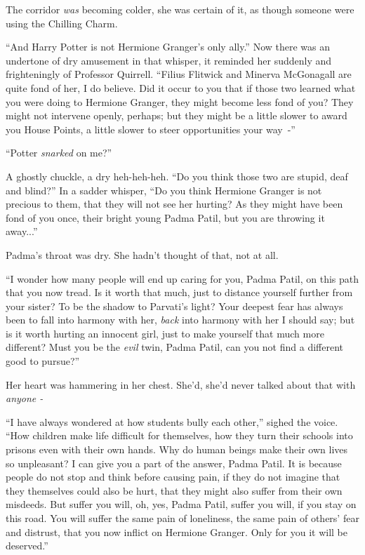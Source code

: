 The corridor \emph{was} becoming colder, she was certain of it, as though someone were using the Chilling Charm.

``And Harry Potter is not Hermione Granger's only ally.'' Now there was an undertone of dry amusement in that whisper, it reminded her suddenly and frighteningly of Professor Quirrell. ``Filius Flitwick and Minerva McGonagall are quite fond of her, I do believe. Did it occur to you that if those two learned what you were doing to Hermione Granger, they might become less fond of you? They might not intervene openly, perhaps; but they might be a little slower to award you House Points, a little slower to steer opportunities your way~-''

``Potter \emph{snarked} on me?''

A ghostly chuckle, a dry heh-heh-heh. ``Do you think those two are stupid, deaf and blind?'' In a sadder whisper, ``Do you think Hermione Granger is not precious to them, that they will not see her hurting? As they might have been fond of you once, their bright young Padma Patil, but you are throwing it away...''

Padma's throat was dry. She hadn't thought of that, not at all.

``I wonder how many people will end up caring for you, Padma Patil, on this path that you now tread. Is it worth that much, just to distance yourself further from your sister? To be the shadow to Parvati's light? Your deepest fear has always been to fall into harmony with her, \emph{back} into harmony with her I should say; but is it worth hurting an innocent girl, just to make yourself that much more different? Must you be the \emph{evil} twin, Padma Patil, can you not find a different good to pursue?''

Her heart was hammering in her chest. She'd, she'd never talked about that with \emph{anyone -}

``I have always wondered at how students bully each other,'' sighed the voice. ``How children make life difficult for themselves, how they turn their schools into prisons even with their own hands. Why do human beings make their own lives so unpleasant? I can give you a part of the answer, Padma Patil. It is because people do not stop and think before causing pain, if they do not imagine that they themselves could also be hurt, that they might also suffer from their own misdeeds. But suffer you will, oh, yes, Padma Patil, suffer you will, if you stay on this road. You will suffer the same pain of loneliness, the same pain of others' fear and distrust, that you now inflict on Hermione Granger. Only for you it will be deserved.''

